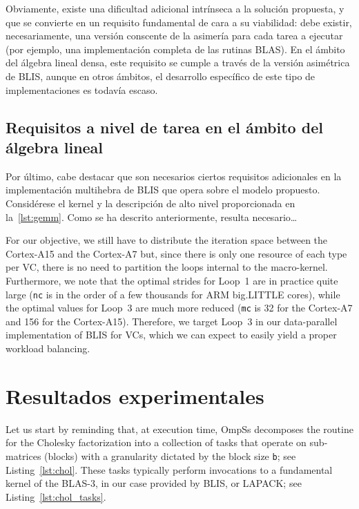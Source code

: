 Obviamente, existe una dificultad adicional intrínseca a la solución propuesta, y que se convierte en un requisito fundamental de cara
a su viabilidad: debe existir, necesariamente, una versión conscente de la asimería para cada tarea a ejecutar (por ejemplo, una implementación
completa de las rutinas BLAS). En el ámbito del álgebra lineal densa, este requisito se cumple a través de la versión asimétrica de BLIS, aunque
en otros ámbitos, el desarrollo específico de este tipo de implementaciones es todavía escaso.

\subsection{Requisitos a nivel de tarea en el ámbito del álgebra lineal}

Por último, cabe destacar que son necesarios ciertos requisitos adicionales en la implementación multihebra de BLIS
que opera sobre el modelo propuesto. Considérese el kernel \gemm y la descripción de alto nivel proporcionada en la~\ref{lst:gemm}. 
Como se ha descrito anteriormente, resulta necesario\ldots


For our objective,
we still have to distribute the iteration space between the Cortex-A15 and the Cortex-A7 but, since there is only one resource of each type per VC,
there is no need to partition the loops internal to the macro-kernel. 
Furthermore, we note that the optimal strides for Loop~1 are in practice quite
large ({\tt nc} is in the order of a few thousands for ARM big.LITTLE cores), while the optimal values for Loop~3 are much more reduced
({\tt mc} is 32 for the Cortex-A7 and 156 for the Cortex-A15). Therefore, we target Loop~3 in our data-parallel implementation of BLIS for
VCs, which we can expect to easily yield a proper workload balancing.


\section{Resultados experimentales}

Let us start by reminding that, at execution time, OmpSs decomposes the routine for the Cholesky factorization into a collection of tasks 
that operate on sub-matrices (blocks) with a granularity 
dictated by the block size {\tt b}; see Listing~\ref{lst:chol}. 
These tasks typically perform invocations to a fundamental kernel of the BLAS-3, 
in our case provided by BLIS, or LAPACK; see Listing~\ref{lst:chol_tasks}.  

